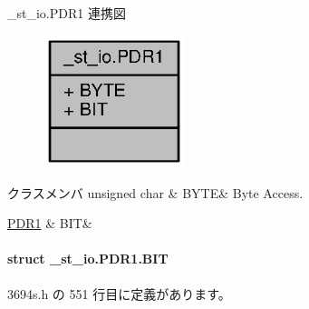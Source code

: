 \+\_\+st\+\_\+io.\+P\+D\+R1 連携図
\nopagebreak
\begin{figure}[H]
\begin{center}
\leavevmode
\includegraphics[width=117pt]{d0/d9a/union__st__io_8PDR1__coll__graph}
\end{center}
\end{figure}
\begin{DoxyFields}{クラスメンバ}
unsigned char\label{3694s_8h_ae409eb2ba6eb6801f52763ae370c350e}
&
B\+Y\+T\+E&
Byte Access. \\
\hline

\hyperlink{3694s_8h_d8/d7a/struct__st__io_8PDR1_8BIT}{P\+D\+R1}\label{3694s_8h_adb957fdc8000e1eef04a243f5199aa52}
&
B\+I\+T&
\\
\hline

\end{DoxyFields}
\label{struct__st__io_8PDR1_8BIT}
\paragraph{struct \+\_\+st\+\_\+io.\+P\+D\+R1.\+B\+I\+T}


 3694s.\+h の 551 行目に定義があります。



